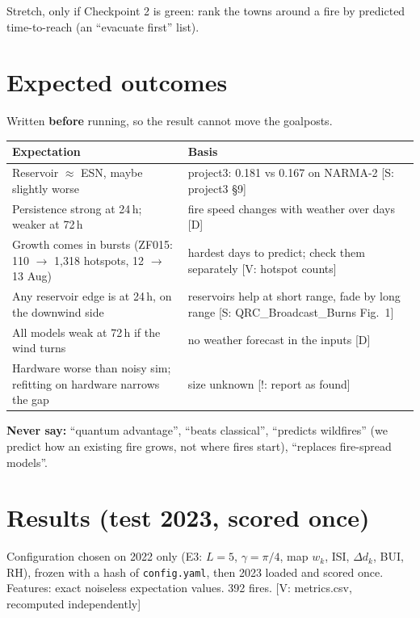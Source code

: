 \documentclass[11pt,a4paper]{article}
\newcommand{\tagbox}[2]{{\footnotesize\color{#1}\textsf{[#2]}}}
\newcommand{\supp}[1]{\tagbox{ForestGreen!70!black}{S: #1}}  %
\newcommand{\veri}[1]{\tagbox{ForestGreen!70!black}{V: #1}}  %
\newcommand{\ours}{\tagbox{NavyBlue}{D}}                      %
\newcommand{\caut}[1]{\tagbox{BrickRed}{!: #1}}               %
\newcommand{\code}[1]{\texttt{\small #1}}
\begin{document}
Stretch, only if Checkpoint 2 is green: rank the towns around a fire by predicted time-to-reach (an
``evacuate first'' list).

\section{Expected outcomes}
Written \textbf{before} running, so the result cannot move the goalposts.

\begin{center}\small
\begin{tabularx}{\linewidth}{@{}Y Y@{}}
\toprule
\textbf{Expectation} & \textbf{Basis}\\
\midrule
Reservoir $\approx$ ESN, maybe slightly worse & project3: 0.181 vs 0.167 on NARMA-2 \supp{project3 \S9}\\
Persistence strong at 24\,h; weaker at 72\,h & fire speed changes with weather over days \ours\\
Growth comes in bursts (ZF015: 110 $\to$ 1{,}318 hotspots, 12 $\to$ 13 Aug) & hardest days to predict; check them
separately \veri{hotspot counts}\\
Any reservoir edge is at 24\,h, on the downwind side & reservoirs help at short range, fade by long range
\supp{QRC\_Broadcast\_Burns Fig.~1}\\
All models weak at 72\,h if the wind turns & no weather forecast in the inputs \ours\\
Hardware worse than noisy sim; refitting on hardware narrows the gap & size unknown \caut{report as found}\\
\bottomrule
\end{tabularx}
\end{center}

\textbf{Never say:} ``quantum advantage'', ``beats classical'', ``predicts wildfires'' (we predict how an existing fire
grows, not where fires start), ``replaces fire-spread models''.

\section{Results (test 2023, scored once)}
Configuration chosen on 2022 only (E3: $L=5$, $\gamma=\pi/4$, map $w_k$, ISI, $\Delta d_k$, BUI, RH), frozen with a hash
of \code{config.yaml}, then 2023 loaded and scored once. Features: exact noiseless expectation values. 392 fires.
\veri{metrics.csv, recomputed independently}
\end{document}
